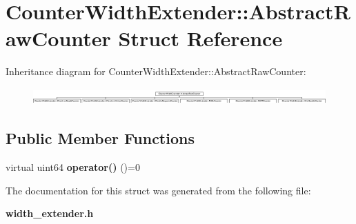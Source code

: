 \section{Counter\+Width\+Extender\+:\+:Abstract\+Raw\+Counter Struct Reference}
\label{structCounterWidthExtender_1_1AbstractRawCounter}
Inheritance diagram for Counter\+Width\+Extender\+:\+:Abstract\+Raw\+Counter\+:\begin{figure}[H]
\begin{center}
\leavevmode
\includegraphics[height=0.645905cm]{structCounterWidthExtender_1_1AbstractRawCounter}
\end{center}
\end{figure}
\subsection*{Public Member Functions}
\begin{DoxyCompactItemize}
\item 
\mbox{\label{structCounterWidthExtender_1_1AbstractRawCounter_a608ae097b3e1fd42768f3cd408fa123d}} 
virtual uint64 {\bfseries operator()} ()=0
\end{DoxyCompactItemize}


The documentation for this struct was generated from the following file\+:\begin{DoxyCompactItemize}
\item 
\textbf{ width\+\_\+extender.\+h}\end{DoxyCompactItemize}
